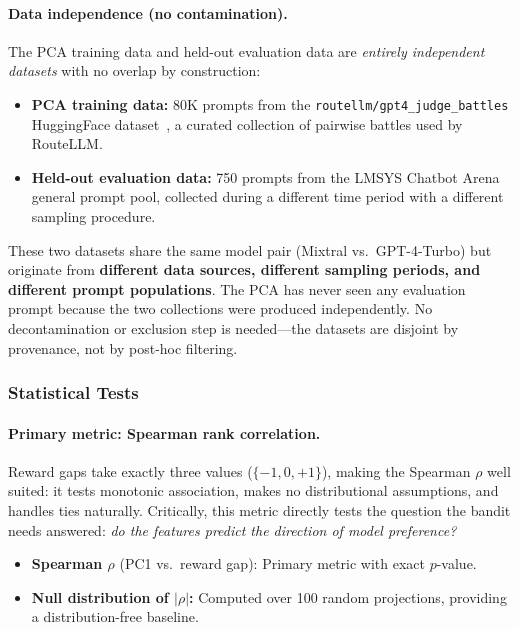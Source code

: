 \paragraph{Data independence (no contamination).}
The PCA training data and held-out evaluation data are \emph{entirely independent datasets} with no overlap by construction:
\begin{itemize}[leftmargin=*,noitemsep,topsep=0pt]
    \item \textbf{PCA training data:} 80K prompts from the \texttt{routellm/gpt4\_judge\_battles} HuggingFace dataset~\cite{routellm}, a curated collection of pairwise battles used by RouteLLM.
    \item \textbf{Held-out evaluation data:} 750 prompts from the LMSYS Chatbot Arena general prompt pool, collected during a different time period with a different sampling procedure.
\end{itemize}
\noindent These two datasets share the same model pair (Mixtral vs.\ GPT-4-Turbo) but originate from \textbf{different data sources, different sampling periods, and different prompt populations}.
The PCA has never seen any evaluation prompt because the two collections were produced independently.
No decontamination or exclusion step is needed---the datasets are disjoint by provenance, not by post-hoc filtering.

\subsubsection{Statistical Tests}

\paragraph{Primary metric: Spearman rank correlation.}
Reward gaps take exactly three values ($\{-1, 0, +1\}$), making the Spearman $\rho$ well suited: it tests monotonic association, makes no distributional assumptions, and handles ties naturally.
Critically, this metric directly tests the question the bandit needs answered: \emph{do the features predict the direction of model preference?}
\begin{itemize}[leftmargin=*,noitemsep,topsep=0pt]
    \item \textbf{Spearman $\rho$} (PC1 vs.\ reward gap): Primary metric with exact $p$-value.
    \item \textbf{Null distribution of $|\rho|$:} Computed over 100 random projections, providing a distribution-free baseline.
\end{itemize}

